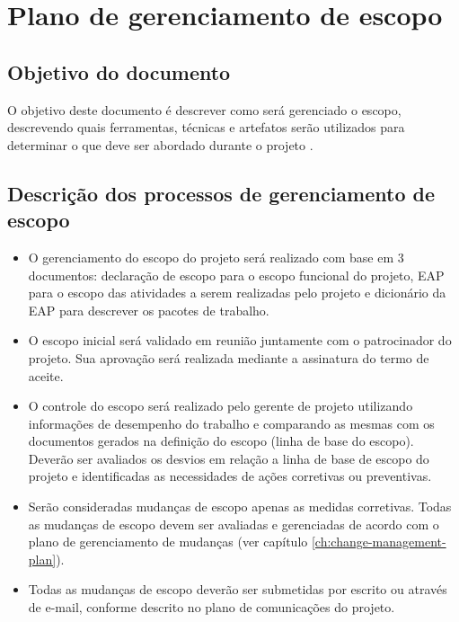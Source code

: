 

\chapter{Plano de gerenciamento de escopo}

\section{Objetivo do documento}

O objetivo deste documento é descrever como será gerenciado o escopo, descrevendo quais ferramentas, técnicas e artefatos serão utilizados para determinar o que deve ser abordado durante o projeto \projectName.

\section{Descrição dos processos de gerenciamento de escopo}

\begin{itemize}
	\item O gerenciamento do escopo do projeto será realizado com base em 3 documentos: declaração de escopo para o escopo funcional do projeto, EAP para o escopo das atividades a serem realizadas pelo projeto e dicionário da EAP para descrever os pacotes de trabalho.
	\item O escopo inicial será validado em reunião juntamente com o patrocinador do projeto. Sua aprovação será realizada mediante a assinatura do termo de aceite.
	\item O controle do escopo será realizado pelo gerente de projeto utilizando informações de desempenho do trabalho e comparando as mesmas com os documentos gerados na definição do escopo (linha de base do escopo). Deverão ser avaliados os desvios em relação a linha de base de escopo do projeto e identificadas as necessidades de ações corretivas ou preventivas.
	\item Serão consideradas mudanças de escopo apenas as medidas corretivas. Todas as mudanças de escopo devem ser avaliadas e gerenciadas de acordo com o plano de gerenciamento de mudanças (ver capítulo \ref{ch:change-management-plan}).
	\item Todas as mudanças de escopo deverão ser submetidas por escrito ou através de e-mail, conforme descrito no plano de comunicações do projeto.
\end{itemize}

